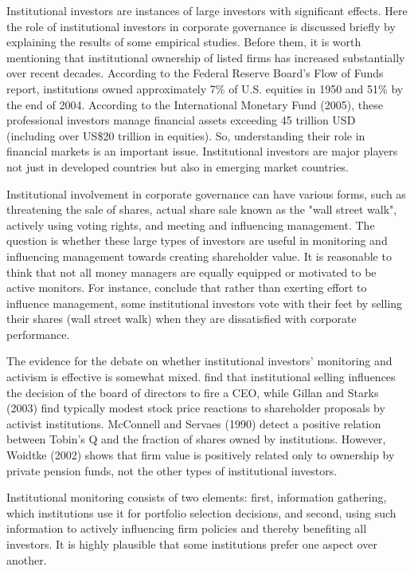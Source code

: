 \documentclass[final,1p,authoryear]{elsarticle}
\begin{document}
Institutional investors are instances of large investors with significant effects. Here the role of institutional investors in corporate governance is discussed briefly by explaining the results of some empirical studies. Before them, it is worth mentioning that institutional ownership of listed firms has increased substantially over recent decades. According to the Federal Reserve Board's Flow of Funds report, institutions owned approximately 7\% of U.S. equities in 1950 and 51\% by the end of 2004. According to the International Monetary Fund (2005), these professional investors manage ﬁnancial assets exceeding 45 trillion USD (including over US\$20 trillion in equities). So, understanding their role in financial markets is an important issue. Institutional investors are major players not just in developed countries but also in emerging market countries.

Institutional involvement in corporate governance can have various forms, such as threatening the sale of shares, actual share sale known as the "wall street walk", actively using voting rights, and meeting and influencing management. The question is whether these large types of investors are useful in monitoring and influencing management towards creating shareholder value. It is reasonable to think that not all money managers are equally equipped or motivated to be active monitors. For instance, \cite{RePEc:eee:jfinec:v:68:y:2003:i:1:p:3-46} conclude that rather than exerting effort to inﬂuence management, some institutional investors vote with their feet by selling their shares (wall street walk) when they are dissatisﬁed with corporate performance.

The evidence for the debate on whether institutional investors' monitoring and activism is effective is somewhat mixed. \cite{RePEc:eee:jfinec:v:68:y:2003:i:1:p:3-46} ﬁnd that institutional selling inﬂuences the decision of the board of directors to ﬁre a CEO, while Gillan and Starks (2003) ﬁnd typically modest stock price reactions to shareholder proposals by activist institutions. McConnell and Servaes (1990) detect a positive relation between Tobin's Q and the fraction of shares owned by institutions. However, Woidtke (2002) shows that ﬁrm value is positively related only to ownership by private pension funds, not the other types of institutional investors.

Institutional monitoring consists of two elements: first, information gathering, which institutions use it for portfolio selection decisions, and second, using such information to actively influencing firm policies and thereby benefiting all investors. It is highly plausible that some institutions prefer one aspect over another.
\end{document}
